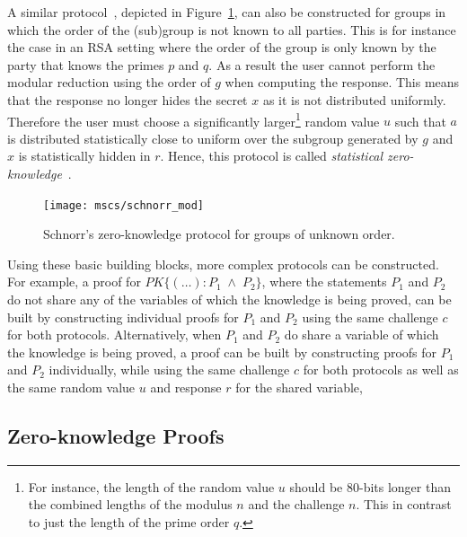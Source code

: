 A similar protocol~\cite{Girault1991}, depicted in Figure~\ref{msc:schnorr_mod},
can also be constructed for groups in which the order of the (sub)group is not
known to all parties. This is for instance the case in an RSA setting where the
order of the group is only known by the party that knows the primes $p$ and $q$.
As a result the user cannot perform the modular reduction using the order of $g$
when computing the response. This means that the response no longer hides the
secret $x$ as it is not distributed uniformly. Therefore the user must choose a
significantly larger\footnote{For instance, the length of the random value $u$
should be 80-bits longer than the combined lengths of the modulus $n$ and the
challenge $n$. This in contrast to just the length of the prime order $q$.}
random value $u$ such that $a$ is distributed statistically close to uniform
over the subgroup generated by $g$ and $x$ is statistically hidden in $r$.
Hence, this protocol is called \emph{statistical zero-knowledge}~\cite{Pointcheval2000}.

\begin{figure}[ht]
  \centering
  \texttt{[image: mscs/schnorr\_mod]}
  \caption{Schnorr's zero-knowledge protocol for groups of unknown order.}
  \label{msc:schnorr_mod}
\end{figure}

Using these basic building blocks, more complex protocols can be constructed.
For example, a proof for $PK\{(\dots) : P_1 \;\land\; P_2 \}$, where the
statements $P_1$ and $P_2$ do not share any of the variables of which the
knowledge is being proved, can be built by constructing individual proofs for
$P_1$ and $P_2$ using the same challenge $c$ for both protocols. Alternatively,
when $P_1$ and $P_2$ do share a variable of which the knowledge is being proved,
a proof can be built by constructing proofs for $P_1$ and $P_2$ individually,
while using the same challenge $c$ for both protocols as well as the same random
value $u$ and response $r$ for the shared variable,

\subsection{Zero-knowledge Proofs}

